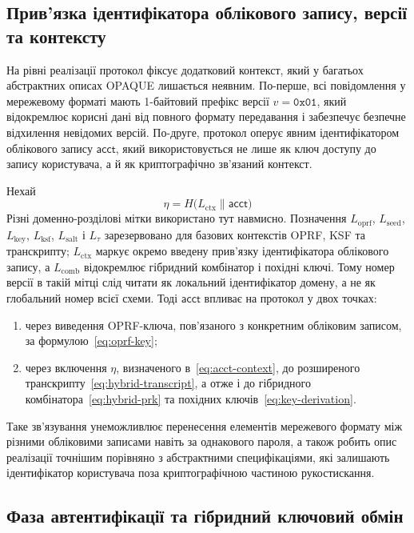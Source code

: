 \documentclass{llncs}
\newcommand{\acct}{\mathsf{acct}}
\newcommand{\Label}[1]{L_{\mathrm{#1}}}
\begin{document}
\subsection{Прив'язка ідентифікатора облікового запису, версії та контексту}

На рівні реалізації протокол фіксує додатковий контекст, який у
багатьох абстрактних описах OPAQUE лишається неявним. По-перше, всі повідомлення у мережевому форматі
мають 1-байтовий префікс версії $v = \mathtt{0x01}$, який відокремлює
корисні дані від повного формату передавання і забезпечує безпечне відхилення
невідомих версій. По-друге, протокол оперує явним ідентифікатором
облікового запису $\acct$, який використовується не лише як
ключ доступу до запису користувача, а й як криптографічно зв'язаний
контекст.

Нехай
\begin{equation}
  \eta = H\!\bigl(\Label{ctx} \| \acct\bigr)
  \label{eq:acct-context}
\end{equation}
Різні доменно-розділові мітки використано тут навмисно. Позначення
$\Label{oprf}$, $\Label{seed}$, $\Label{key}$, $\Label{ksf}$,
$\Label{salt}$ і $L_{\tau}$ зарезервовано для базових контекстів OPRF,
KSF та транскрипту; $\Label{ctx}$ маркує окремо введену прив'язку
ідентифікатора облікового запису, а $\Label{comb}$ відокремлює
гібридний комбінатор і похідні ключі. Тому номер версії в такій мітці
слід читати як локальний ідентифікатор домену, а не як глобальний номер
всієї схеми.
Тоді $\acct$ впливає на протокол у двох точках:
\begin{enumerate}
  \item через виведення OPRF-ключа, пов'язаного з конкретним обліковим записом,
        за формулою~\eqref{eq:oprf-key};
  \item через включення $\eta$, визначеного в~\eqref{eq:acct-context},
        до розширеного транскрипту~\eqref{eq:hybrid-transcript}, а отже і до
        гібридного комбінатора~\eqref{eq:hybrid-prk} та похідних
        ключів~\eqref{eq:key-derivation}.
\end{enumerate}
Таке зв'язування унеможливлює перенесення елементів мережевого формату між різними
обліковими записами навіть за однакового пароля, а також робить опис
реалізації точнішим порівняно з абстрактними специфікаціями, які залишають
ідентифікатор користувача поза криптографічною частиною рукостискання.

\subsection{Фаза автентифікації та гібридний ключовий обмін}
\end{document}
